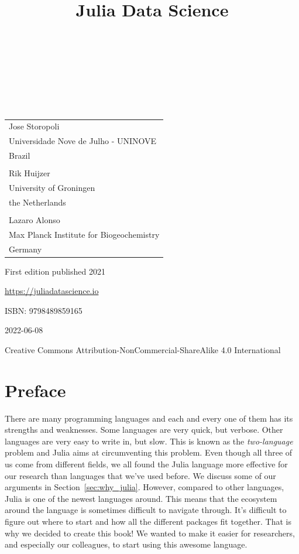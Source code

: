 \documentclass[
  notoc %
]{tufte-book}
\title{Julia Data Science}
\author{\noindent{Jose Storopoli}\\[3mm] \noindent{Rik
Huijzer}\\[3mm] \noindent{Lazaro Alonso}\\[3mm] }
\date{}
\begin{document}
\makeatletter
\thispagestyle{empty}
\vfill
{\Huge\bf
\noindent
\@title
}\\[1in]
{\Large
\noindent
\@author
}
\makeatother

\makeatletter
\newpage
\thispagestyle{empty}
\vfill
{\noindent
\begin{tabular}{l} Jose Storopoli\\ Universidade Nove de Julho - UNINOVE\\ Brazil\\ \\ Rik Huijzer\\ University of Groningen\\ the Netherlands\\ \\ Lazaro Alonso\\ Max Planck Institute for Biogeochemistry\\ Germany \end{tabular}
}
\vfill
{\small
First edition published 2021

\url{https://juliadatascience.io}

ISBN: 9798489859165

2022-06-08

Creative Commons Attribution-NonCommercial-ShareAlike 4.0 International
}
\makeatother


\frontmatter
\mainmatter

\setcounter{tocdepth}{1}
\tableofcontents

\justifying

\setlength{\parindent}{0pt}

\hypertarget{sec:preface}{%
\chapter{Preface}\label{sec:preface}}

There are many programming languages and each and every one of them has
its strengths and weaknesses. Some languages are very quick, but
verbose. Other languages are very easy to write in, but slow. This is
known as the \emph{two-language} problem and Julia aims at circumventing
this problem. Even though all three of us come from different fields, we
all found the Julia language more effective for our research than
languages that we've used before. We discuss some of our arguments in
Section~\ref{sec:why_julia}. However, compared to other languages, Julia
is one of the newest languages around. This means that the ecosystem
around the language is sometimes difficult to navigate through. It's
difficult to figure out where to start and how all the different
packages fit together. That is why we decided to create this book! We
wanted to make it easier for researchers, and especially our colleagues,
to start using this awesome language.
\end{document}
